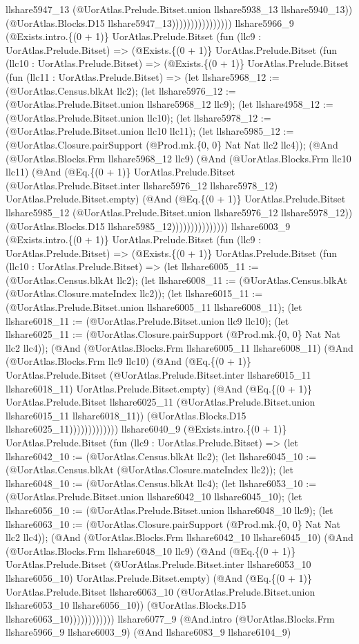 \documentclass[11pt]{article}
\begin{document}
llshare5947\_13 (@UorAtlas.Prelude.Bitset.union llshare5938\_13 llshare5940\_13)) (@UorAtlas.Blocks.D15 llshare5947\_13)))))))))))))))) llshare5966\_9 (@Exists.intro.\{(0 + 1)\} UorAtlas.Prelude.Bitset (fun (llc9 : UorAtlas.Prelude.Bitset) => (@Exists.\{(0 + 1)\} UorAtlas.Prelude.Bitset (fun (llc10 : UorAtlas.Prelude.Bitset) => (@Exists.\{(0 + 1)\} UorAtlas.Prelude.Bitset (fun (llc11 : UorAtlas.Prelude.Bitset) => (let llshare5968\_12 := (@UorAtlas.Census.blkAt llc2); (let llshare5976\_12 := (@UorAtlas.Prelude.Bitset.union llshare5968\_12 llc9); (let llshare4958\_12 := (@UorAtlas.Prelude.Bitset.union llc10); (let llshare5978\_12 := (@UorAtlas.Prelude.Bitset.union llc10 llc11); (let llshare5985\_12 := (@UorAtlas.Closure.pairSupport (@Prod.mk.\{0, 0\} Nat Nat llc2 llc4)); (@And (@UorAtlas.Blocks.Frm llshare5968\_12 llc9) (@And (@UorAtlas.Blocks.Frm llc10 llc11) (@And (@Eq.\{(0 + 1)\} UorAtlas.Prelude.Bitset (@UorAtlas.Prelude.Bitset.inter llshare5976\_12 llshare5978\_12) UorAtlas.Prelude.Bitset.empty) (@And (@Eq.\{(0 + 1)\} UorAtlas.Prelude.Bitset llshare5985\_12 (@UorAtlas.Prelude.Bitset.union llshare5976\_12 llshare5978\_12)) (@UorAtlas.Blocks.D15 llshare5985\_12))))))))))))))) llshare6003\_9 (@Exists.intro.\{(0 + 1)\} UorAtlas.Prelude.Bitset (fun (llc9 : UorAtlas.Prelude.Bitset) => (@Exists.\{(0 + 1)\} UorAtlas.Prelude.Bitset (fun (llc10 : UorAtlas.Prelude.Bitset) => (let llshare6005\_11 := (@UorAtlas.Census.blkAt llc2); (let llshare6008\_11 := (@UorAtlas.Census.blkAt (@UorAtlas.Closure.mateIndex llc2)); (let llshare6015\_11 := (@UorAtlas.Prelude.Bitset.union llshare6005\_11 llshare6008\_11); (let llshare6018\_11 := (@UorAtlas.Prelude.Bitset.union llc9 llc10); (let llshare6025\_11 := (@UorAtlas.Closure.pairSupport (@Prod.mk.\{0, 0\} Nat Nat llc2 llc4)); (@And (@UorAtlas.Blocks.Frm llshare6005\_11 llshare6008\_11) (@And (@UorAtlas.Blocks.Frm llc9 llc10) (@And (@Eq.\{(0 + 1)\} UorAtlas.Prelude.Bitset (@UorAtlas.Prelude.Bitset.inter llshare6015\_11 llshare6018\_11) UorAtlas.Prelude.Bitset.empty) (@And (@Eq.\{(0 + 1)\} UorAtlas.Prelude.Bitset llshare6025\_11 (@UorAtlas.Prelude.Bitset.union llshare6015\_11 llshare6018\_11)) (@UorAtlas.Blocks.D15 llshare6025\_11))))))))))))) llshare6040\_9 (@Exists.intro.\{(0 + 1)\} UorAtlas.Prelude.Bitset (fun (llc9 : UorAtlas.Prelude.Bitset) => (let llshare6042\_10 := (@UorAtlas.Census.blkAt llc2); (let llshare6045\_10 := (@UorAtlas.Census.blkAt (@UorAtlas.Closure.mateIndex llc2)); (let llshare6048\_10 := (@UorAtlas.Census.blkAt llc4); (let llshare6053\_10 := (@UorAtlas.Prelude.Bitset.union llshare6042\_10 llshare6045\_10); (let llshare6056\_10 := (@UorAtlas.Prelude.Bitset.union llshare6048\_10 llc9); (let llshare6063\_10 := (@UorAtlas.Closure.pairSupport (@Prod.mk.\{0, 0\} Nat Nat llc2 llc4)); (@And (@UorAtlas.Blocks.Frm llshare6042\_10 llshare6045\_10) (@And (@UorAtlas.Blocks.Frm llshare6048\_10 llc9) (@And (@Eq.\{(0 + 1)\} UorAtlas.Prelude.Bitset (@UorAtlas.Prelude.Bitset.inter llshare6053\_10 llshare6056\_10) UorAtlas.Prelude.Bitset.empty) (@And (@Eq.\{(0 + 1)\} UorAtlas.Prelude.Bitset llshare6063\_10 (@UorAtlas.Prelude.Bitset.union llshare6053\_10 llshare6056\_10)) (@UorAtlas.Blocks.D15 llshare6063\_10)))))))))))) llshare6077\_9 (@And.intro (@UorAtlas.Blocks.Frm llshare5966\_9 llshare6003\_9) (@And llshare6083\_9 llshare6104\_9) 
\end{document}
